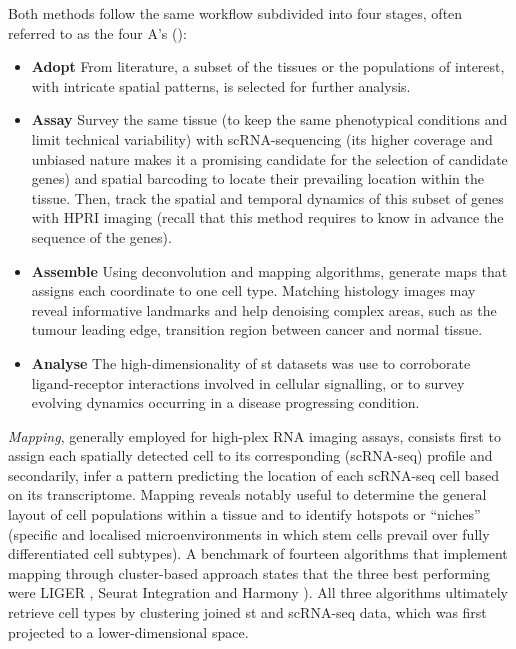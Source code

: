 Both methods follow the same workflow subdivided into four stages, often referred to as the four A's (\autocite[Fig. 4]{longo_etal21}):
\begin{itemize}
    \item \textbf{Adopt} From literature, a subset of the tissues or the populations of interest, with intricate spatial patterns, is selected for further analysis. 
    \item \textbf{Assay} Survey the same tissue (to keep the same phenotypical conditions and limit technical variability) with scRNA-sequencing (its higher coverage and unbiased nature makes it a promising candidate for the selection of candidate genes) and spatial barcoding to locate their prevailing location within the tissue. Then, track the spatial and temporal dynamics of this subset of genes with HPRI imaging (recall that this method requires to know in advance the sequence of the genes).
    \item \textbf{Assemble} Using deconvolution and mapping algorithms, generate maps that assigns each coordinate to one cell type. Matching histology images may reveal informative landmarks and help denoising complex areas, such as the tumour leading edge, transition region between cancer and normal tissue. 
    \item \textbf{Analyse} The high-dimensionality of \acrshort{st} datasets was use to corroborate ligand-receptor interactions involved in cellular signalling, or to survey evolving dynamics occurring in a disease progressing condition.
\end{itemize}

\textit{Mapping}, generally employed for high-plex RNA imaging assays, consists first to assign each spatially detected cell to its corresponding (scRNA-seq) profile and secondarily, infer a pattern predicting the location of each scRNA-seq cell based on its transcriptome. Mapping reveals notably useful to determine the general layout of cell populations within a tissue and to identify hotspots or \enquote{niches} (specific and localised microenvironments in which stem cells prevail over fully differentiated cell subtypes). A benchmark of fourteen algorithms that implement mapping through cluster-based approach \autocite{tran_etal20} states that the three best performing were LIGER \autocite{welch_etal19}, Seurat Integration \autocite{stuart_etal19} and Harmony \autocite{korsunsky_etal19}). All three algorithms ultimately retrieve cell types by clustering joined \Gls{st} and scRNA-seq data, which was first projected to a lower-dimensional space. 


